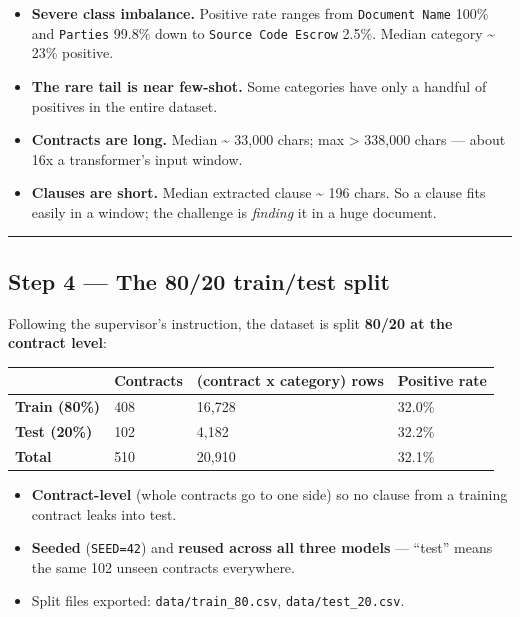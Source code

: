 \documentclass[
  10pt,
]{article}
\providecommand{\tightlist}{%
  \setlength{\itemsep}{0pt}\setlength{\parskip}{0pt}}
\begin{document}
\begin{itemize}
\tightlist
\item
  \textbf{Severe class imbalance.} Positive rate ranges from
  \texttt{Document\ Name} 100\% and \texttt{Parties} 99.8\% down to
  \texttt{Source\ Code\ Escrow} 2.5\%. Median category \textasciitilde{} 23\%
  positive.
\item
  \textbf{The rare tail is near few-shot.} Some categories have only a handful
  of positives in the entire dataset.
\item
  \textbf{Contracts are long.} Median \textasciitilde{} 33,000 chars; max
  \textgreater{} 338,000 chars --- about 16x a transformer's input window.
\item
  \textbf{Clauses are short.} Median extracted clause \textasciitilde{} 196
  chars. So a clause fits easily in a window; the challenge is \emph{finding} it
  in a huge document.
\end{itemize}

\begin{center}\rule{0.5\linewidth}{0.5pt}\end{center}

\subsection{Step 4 --- The 80/20 train/test split}

Following the supervisor's instruction, the dataset is split \textbf{80/20 at
the contract level}:

\begin{longtable}[]{@{}llll@{}}
\toprule
& Contracts & (contract x category) rows & Positive rate \\
\midrule
\endhead
\textbf{Train (80\%)} & 408 & 16,728 & 32.0\% \\
\textbf{Test (20\%)} & 102 & 4,182 & 32.2\% \\
\textbf{Total} & 510 & 20,910 & 32.1\% \\
\bottomrule
\end{longtable}

\begin{itemize}
\tightlist
\item
  \textbf{Contract-level} (whole contracts go to one side) so no clause from a
  training contract leaks into test.
\item
  \textbf{Seeded} (\texttt{SEED=42}) and \textbf{reused across all three models}
  --- ``test'' means the same 102 unseen contracts everywhere.
\item
  Split files exported: \texttt{data/train\_80.csv}, \texttt{data/test\_20.csv}.
\end{itemize}
\end{document}
